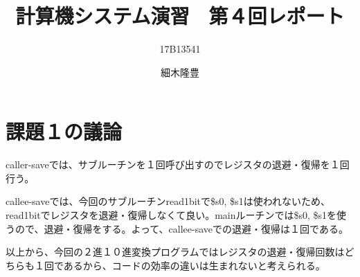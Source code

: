 \documentclass{jarticle}
\title{計算機システム演習　第４回レポート}
\author{17B13541 \and 細木隆豊}
\date{}
\begin{document}
\maketitle
  \section{課題１の議論}
    caller-saveでは、サブルーチンを１回呼び出すのでレジスタの退避・復帰を１回行う。

    callee-saveでは、今回のサブルーチンread1bitで\$s0, \$s1は使われないため、read1bitでレジスタを退避・復帰しなくて良い。mainルーチンでは\$s0, \$s1を使うので、退避・復帰をする。よって、callee-saveでの退避・復帰は１回である。

    以上から、今回の２進１０進変換プログラムではレジスタの退避・復帰回数はどちらも１回であるから、コードの効率の違いは生まれないと考えられる。
\end{document}
